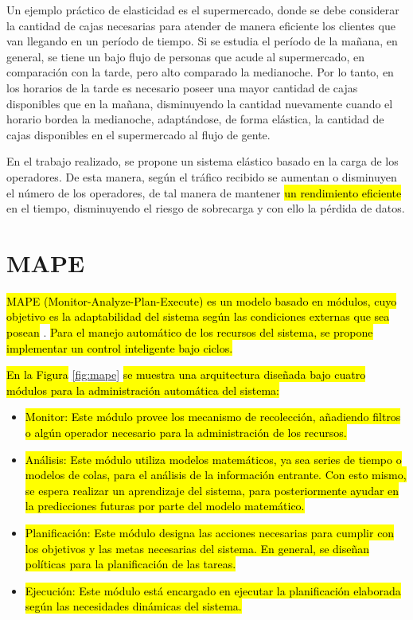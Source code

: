 Un ejemplo práctico de elasticidad es el supermercado, donde se debe considerar la cantidad de cajas necesarias para atender de manera eficiente los clientes que van llegando en un período de tiempo. Si se estudia el período de la mañana, en general, se tiene un bajo flujo de personas que acude al supermercado, en comparación con la tarde, pero alto comparado la medianoche. Por lo tanto, en los horarios de la tarde es necesario poseer una mayor cantidad de cajas disponibles que en la mañana, disminuyendo la cantidad nuevamente cuando el horario bordea la medianoche, adaptándose, de forma elástica, la cantidad de cajas disponibles en el supermercado al flujo de gente.

En el trabajo realizado, se propone un sistema elástico basado en la carga de los operadores. De esta manera, según el tráfico recibido se aumentan o disminuyen el número de los operadores, de tal manera de mantener \hl{un rendimiento eficiente} en el tiempo, disminuyendo el riesgo de sobrecarga y con ello la pérdida de datos.

\section{MAPE}
\label{sec:MAPE}
\hl{MAPE (Monitor-Analyze-Plan-Execute) es un modelo basado en módulos, cuyo objetivo es la adaptabilidad del sistema según las condiciones externas que sea posean} \citep{ibm2005architectural}. \hl{Para el manejo automático de los recursos del sistema, se propone implementar un control inteligente bajo ciclos.}

\hl{En la Figura} \ref{fig:mape} \hl{se muestra una arquitectura diseñada bajo cuatro módulos para la administración automática del sistema:}

\begin{itemize}
	\item \hl{Monitor: Este módulo provee los mecanismo de recolección, añadiendo filtros o algún operador necesario para la administración de los recursos.}
	\item \hl{Análisis: Este módulo utiliza modelos matemáticos, ya sea series de tiempo o modelos de colas, para el análisis de la información entrante. Con esto mismo, se espera realizar un aprendizaje del sistema, para posteriormente ayudar en la predicciones futuras por parte del modelo matemático.}
	\item \hl{Planificación: Este módulo designa las acciones necesarias para cumplir con los objetivos y las metas necesarias del sistema. En general, se diseñan políticas para la planificación de las tareas.}
	\item \hl{Ejecución: Este módulo está encargado en ejecutar la planificación elaborada según las necesidades dinámicas del sistema.}
\end{itemize}

